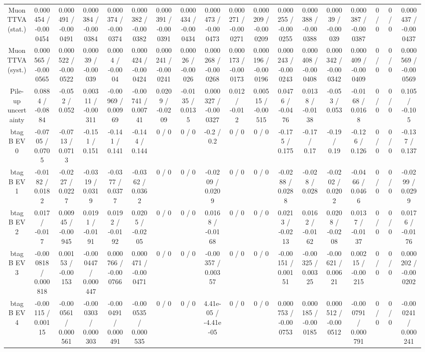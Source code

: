 \documentclass[10pt]{article}
\begin{document}
\begin{table}[htbp]
\begin{center}
\begin{tabular}{|c|c|c|c|c|c|c|c|c|c|c|c|c|c|c|c|c|c|}
  Muon TTVA (stat.) & 0.000454 / -0.000454 & 0.000491 / -0.000491 & 0.000384 / -0.000384 & 0.000374 / -0.000374 & 0.000382 / -0.000382 & 0.000391 / -0.000391 & 0.000434 / -0.000434 & 0.000473 / -0.000473 & 0.000271 / -0.000271 & 0.000209 / -0.000209 & 0.000255 / -0.000255 & 0.000388 / -0.000388 & 0.00039 / -0.00039 & 0.000387 / -0.000387 & 0 / 0 & 0 / 0 & 0.000437 / -0.000437 \\ 
  Muon TTVA (syst.) & 0.000565 / -0.000565 & 0.000522 / -0.000522 & 0.00039 / -0.00039 & 0.0004 / -0.0004 & 0.000424 / -0.000424 & 0.000241 / -0.000241 & 0.00026 / -0.00026 & 0.000268 / -0.000268 & 0.000173 / -0.000173 & 0.000196 / -0.000196 & 0.000243 / -0.000243 & 0.000408 / -0.000408 & 0.000342 / -0.000342 & 0.000409 / -0.000409 & 0 / 0 & 0 / 0 & 0.000569 / -0.000569 \\ 
  Pile-up uncertainty & 0.0884 / -0.0884 & -0.052 / 0.052 & 0.00311 / -0.00311 & -0.00969 / 0.00969 & -0.00741 / 0.00741 & 0.0209 / -0.0209 & -0.0135 / 0.0135 & 0.000327 / -0.000327 & 0.012 / -0.012 & 0.00515 / -0.00515 & 0.0476 / -0.0476 & 0.0138 / -0.0138 & -0.053 / 0.053 & -0.0168 / 0.0168 & 0 / 0 & 0 / 0 & 0.105 / -0.105 \\ 
  btag B EV 0 & -0.0705 / 0.0705 & -0.0713 / 0.0713 & -0.151 / 0.151 & -0.141 / 0.141 & -0.144 / 0.144 & 0 / 0 & 0 / 0 & -0.2 / 0.2 & 0 / 0 & 0 / 0 & -0.175 / 0.175 & -0.17 / 0.17 & -0.19 / 0.19 & -0.126 / 0.126 & 0 / 0 & 0 / 0 & -0.137 / 0.137 \\ 
  btag B EV 1 & -0.0182 / 0.0182 & -0.0227 / 0.0227 & -0.0319 / 0.0319 & -0.0377 / 0.0377 & -0.0362 / 0.0362 & 0 / 0 & 0 / 0 & -0.0209 / 0.0209 & 0 / 0 & 0 / 0 & -0.0288 / 0.0288 & -0.028 / 0.028 & -0.0202 / 0.0202 & -0.0466 / 0.0466 & 0 / 0 & 0 / 0 & -0.0299 / 0.0299 \\ 
  btag B EV 2 & 0.017 / -0.017 & 0.00945 / -0.00945 & 0.0191 / -0.0191 & 0.0192 / -0.0192 & 0.0205 / -0.0205 & 0 / 0 & 0 / 0 & 0.0168 / -0.0168 & 0 / 0 & 0 / 0 & 0.0213 / -0.0213 & 0.0162 / -0.0162 & 0.0208 / -0.0208 & 0.0137 / -0.0137 & 0 / 0 & 0 / 0 & 0.0176 / -0.0176 \\ 
  btag B EV 3 & -0.000818 / 0.000818 & 0.00153 / -0.00153 & -0.000447 / 0.000447 & 0.000766 / -0.000766 & 0.000471 / -0.000471 & 0 / 0 & 0 / 0 & -0.00357 / 0.00357 & 0 / 0 & 0 / 0 & -0.00151 / 0.00151 & -0.00325 / 0.00325 & -0.00621 / 0.00621 & 0.00215 / -0.00215 & 0 / 0 & 0 / 0 & 0.000202 / -0.000202 \\ 
  btag B EV 4 & -0.00115 / 0.00115 & -0.000561 / 0.000561 & -0.000303 / 0.000303 & -0.000491 / 0.000491 & -0.000535 / 0.000535 & 0 / 0 & 0 / 0 & 4.41e-05 / -4.41e-05 & 0 / 0 & 0 / 0 & 0.000753 / -0.000753 & 0.000185 / -0.000185 & 0.000512 / -0.000512 & -0.000791 / 0.000791 & 0 / 0 & 0 / 0 & -0.000241 / 0.000241 \\ 

\end{tabular}
\end{center}
\end{table}
\end{document}
